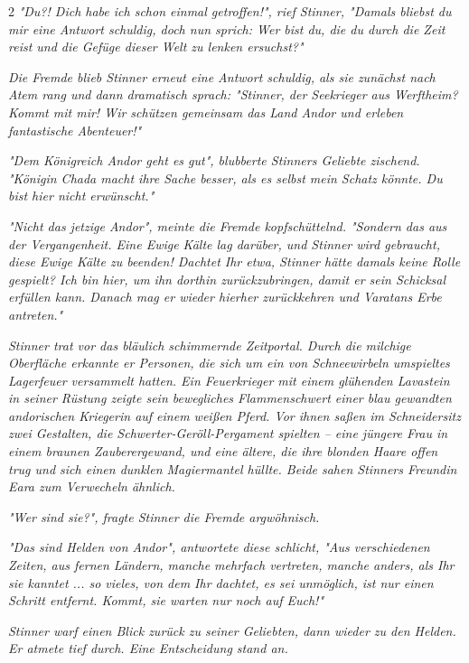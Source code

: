 \documentclass[10pt, a4paper, oneside]{book}
\newcommand{\fan}[1]{\textit{#1}}
\begin{document}
\begin{multicols*}{2}
\textit{\fan{"Du?! Dich habe ich schon einmal getroffen!", rief Stinner, "Damals bliebst du mir eine Antwort schuldig, doch nun sprich: Wer bist du, die du durch die Zeit reist und die Gefüge dieser Welt zu lenken ersuchst?"}}

\textit{\fan{Die Fremde blieb Stinner erneut eine Antwort schuldig, als sie zunächst nach Atem rang und dann dramatisch sprach: "Stinner, der Seekrieger aus Werftheim? Kommt mit mir! Wir schützen gemeinsam das Land Andor und erleben fantastische Abenteuer!"}}

\textit{\fan{"Dem Königreich Andor geht es gut", blubberte Stinners Geliebte zischend. "Königin Chada macht ihre Sache besser, als es selbst mein Schatz könnte. Du bist hier nicht erwünscht." }}

\textit{\fan{"Nicht das jetzige Andor", meinte die Fremde kopfschüttelnd. "Sondern das aus der Vergangenheit. Eine Ewige Kälte lag darüber, und Stinner wird gebraucht, diese Ewige Kälte zu beenden! Dachtet Ihr etwa, Stinner hätte damals keine Rolle gespielt? Ich bin hier, um ihn dorthin zurückzubringen, damit er sein Schicksal erfüllen kann. Danach mag er wieder hierher zurückkehren und Varatans Erbe antreten."}}

\textit{\fan{Stinner trat vor das bläulich schimmernde Zeitportal. Durch die milchige Oberfläche erkannte er Personen, die sich um ein von Schneewirbeln umspieltes Lagerfeuer versammelt hatten. Ein Feuerkrieger mit einem glühenden Lavastein in seiner Rüstung zeigte sein bewegliches Flammenschwert einer blau gewandten andorischen Kriegerin auf einem weißen Pferd. Vor ihnen saßen im Schneidersitz zwei Gestalten, die Schwerter-Geröll-Pergament spielten – eine jüngere Frau in einem braunen Zauberergewand, und eine ältere, die ihre blonden Haare offen trug und sich einen dunklen Magiermantel hüllte. Beide sahen Stinners Freundin Eara zum Verwecheln ähnlich.}}

\textit{\fan{"Wer sind sie?", fragte Stinner die Fremde argwöhnisch.}}

\textit{\fan{"Das sind Helden von Andor", antwortete diese schlicht, "Aus verschiedenen Zeiten, aus fernen Ländern, manche mehrfach vertreten, manche anders, als Ihr sie kanntet ... so vieles, von dem Ihr dachtet, es sei unmöglich, ist nur einen Schritt entfernt. Kommt, sie warten nur noch auf Euch!"}}

\textit{\fan{Stinner warf einen Blick zurück zu seiner Geliebten, dann wieder zu den Helden. Er atmete tief durch. Eine Entscheidung stand an.}}



\newpage


\setcounter{tocdepth}{0}
\tableofcontents






\end{multicols*}
\end{document}
